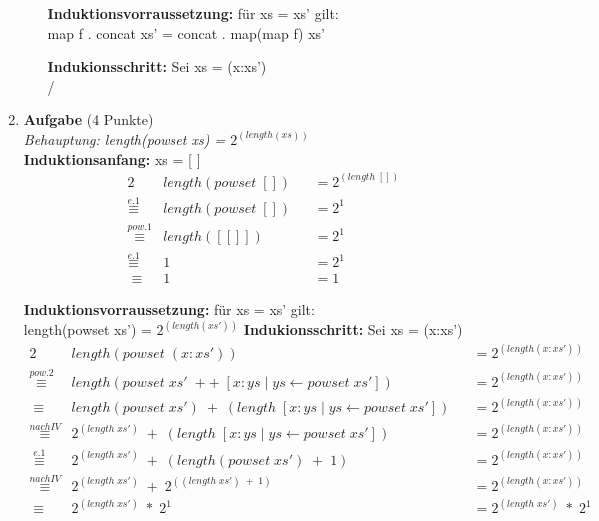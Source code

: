 \documentclass[11pt]{article}
\newcommand{\punkte}[1]{{\small{ }(#1 Punkte)}}
\newcommand{\aufgabe}[1]{\item{\bf #1}}
\begin{document}
\begin{enumerate}
\begin{enumerate}
\vspace*{0.5cm}
\textbf{Induktionsvorraussetzung:} für xs = xs' gilt:\\
map f . concat xs' = concat . map(map f) xs'

\vspace*{0.5cm}
\textbf{Indukionsschritt:} Sei xs = (x:xs')\\
/
\end{enumerate}
	\aufgabe{Aufgabe}\punkte{4}\\
\vspace*{0.5cm}
\textit{Behauptung: length(powset xs) = $2^{(length(xs))}$}\\
\textbf{Induktionsanfang:} xs = [ ]
\begin{alignat*}{2}
&length(powset\phantom{.}[])&&=2^{(length\phantom{.}[])}\\
\stackrel{e.1}{\equiv}&length(powset\phantom{.}[])&&=2^1\\
\stackrel{pow.1}{\equiv}&length([[]])&&=2^1\\
\stackrel{e.1}{\equiv}&1&&=2^1\\
\equiv\phantom{.}&1&&=1
\end{alignat*}

\vspace*{0.5cm}
\textbf{Induktionsvorraussetzung:} für xs = xs' gilt:\\
length(powset xs') = $2^{(length(xs'))}$
\newpage
\vspace*{0.5cm}
\textbf{Indukionsschritt:} Sei xs = (x:xs')
\begin{alignat*}{2}
&length(powset\phantom{.}(x:xs'))&&=2^{(length(x:xs'))}\\
\stackrel{pow.2}{\equiv}&length(powset\phantom{.}xs'\phantom{.}++\phantom{.}[x:ys\phantom{.}|\phantom{.}ys \leftarrow powset\phantom{.}xs'])&&=2^{(length(x:xs'))}\\
\equiv\phantom{.}&length(powset\phantom{.}xs')\phantom{.}+\phantom{.}(length\phantom{.}[x:ys\phantom{.}|\phantom{.}ys \leftarrow powset\phantom{.}xs'])&&=2^{(length(x:xs'))}\\
\stackrel{nach IV}{\equiv}&2^{(length\phantom{.}xs')}\phantom{.}+\phantom{.}(length\phantom{.}[x:ys\phantom{.}|\phantom{.}ys\leftarrow powset\phantom{.}xs'])&&=2^{(length(x:xs'))}\\
\stackrel{e.1}{\equiv}\phantom{.}&2^{(length\phantom{.}xs')}\phantom{.}+\phantom{.}(length(powset\phantom{.}xs')\phantom{.}+\phantom{.}1)&&=2^{(length(x:xs'))}\\
\stackrel{nach IV}{\equiv}&2^{(length\phantom{.}xs')}\phantom{.}+\phantom{.}2^{((length\phantom{.}xs')\phantom{.}+\phantom{.}1)}&&=2^{(length(x:xs'))}\\
\equiv\phantom{.}&2^{(length\phantom{.}xs')}\phantom{.}*\phantom{.}2^1&&=2^{(length\phantom{.}xs')}\phantom{.}*\phantom{.}2^1
\end{alignat*}


\end{enumerate}
\end{document}
